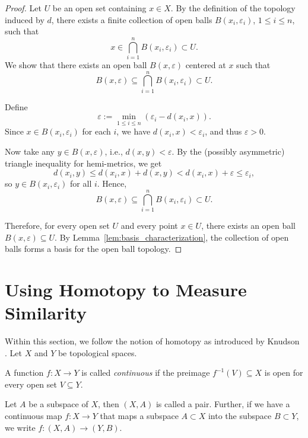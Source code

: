 \begin{proof}
Let $U$ be an open set containing $x \in X$. By the definition of the topology induced by $d$, there exists a finite collection of open balls $B(x_i, \varepsilon_i)$, $1 \leq i \leq n$, such that
\[
x \in \bigcap_{i=1}^n B(x_i, \varepsilon_i)\subset U.
\]
We show that there exists an open ball $B(x, \varepsilon)$ centered at $x$ such that
\[
B(x, \varepsilon) \subseteq \bigcap_{i=1}^n B(x_i, \varepsilon_i)\subset U.
\]

Define
\[
\varepsilon := \min_{1 \leq i \leq n} \left( \varepsilon_i - d(x_i, x) \right).
\]
Since $x \in B(x_i, \varepsilon_i)$ for each $i$, we have $d(x_i, x) < \varepsilon_i$, and thus $\varepsilon > 0$.

Now take any $y \in B(x, \varepsilon)$, i.e., $d(x, y) < \varepsilon$.
By the (possibly asymmetric) triangle inequality for hemi-metrics, we get
\[
d(x_i, y) \leq d(x_i, x) + d(x, y) < d(x_i, x) + \varepsilon \leq \varepsilon_i,
\]
so $y \in B(x_i, \varepsilon_i)$ for all $i$. Hence,
\[
B(x, \varepsilon) \subseteq \bigcap_{i=1}^n B(x_i, \varepsilon_i) \subset U.
\]

Therefore, for every open set $U$ and every point $x \in U$, there exists an open ball $B(x, \varepsilon) \subseteq U$. By Lemma~\ref{lem:basis_characterization}, the collection of open balls forms a basis for the open ball topology.
\end{proof}



\section{Using Homotopy to Measure Similarity}\label{UHtMS}

Within this section, we follow the notion of homotopy as introduced by Knudson \cite{knudson_algtop}. 
Let \( X \) and \( Y \) be topological spaces.

A function \( f: X \rightarrow Y \) is called \emph{continuous} if the preimage \( f^{-1}(V) \subseteq X \) is open for every open set \( V \subseteq Y \).

Let $A$ be a subspace of $X$, then $(X,A)$ is called a pair. 
Further, if we have a continuous map $f:X \rightarrow Y$ that maps a subspace $A\subset X $ into the subspace $B \subset Y$, we write $f: (X,A) \rightarrow (Y,B)$.


